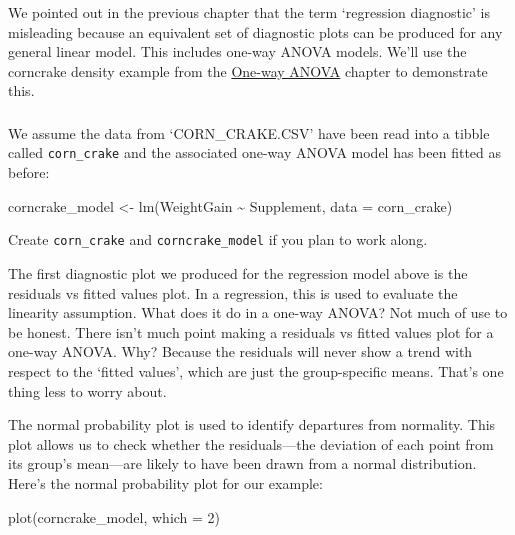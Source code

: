 \documentclass[
]{book}
\newenvironment{Shaded}{\begin{snugshade}}{\end{snugshade}}
\newcommand{\AttributeTok}[1]{\textcolor[rgb]{0.77,0.63,0.00}{#1}}
\newcommand{\DecValTok}[1]{\textcolor[rgb]{0.00,0.00,0.81}{#1}}
\newcommand{\FunctionTok}[1]{\textcolor[rgb]{0.00,0.00,0.00}{#1}}
\newcommand{\NormalTok}[1]{#1}
\newcommand{\OtherTok}[1]{\textcolor[rgb]{0.56,0.35,0.01}{#1}}
\newcommand{\SpecialCharTok}[1]{\textcolor[rgb]{0.00,0.00,0.00}{#1}}
\newenvironment{greybox}{
  \definecolor{shadecolor}{rgb}{0.95,0.95,0.95}  %
  \color{black}
  \begin{shaded}}
 {\end{shaded}}
\newenvironment{infobox}[1]
  {
  \begin{itemize}
  \renewcommand{\labelitemi}{
    \raisebox{-.7\height}[0pt][0pt]{
      {\setkeys{Gin}{width=3em,keepaspectratio}
        \texttt{[image: images/\#1]}}
    }
  }
  \setlength{\fboxsep}{1em}
  \begin{greybox}
  \item
  }
  {
  \end{greybox}
  \end{itemize}
  }
\begin{document}
We pointed out in the previous chapter that the term `regression diagnostic' is misleading because an equivalent set of diagnostic plots can be produced for any general linear model. This includes one-way ANOVA models. We'll use the corncrake density example from the \protect\hyperlink{one-way-anova-in-R}{One-way ANOVA} chapter to demonstrate this.

\begin{infobox}{action}

\hypertarget{section-14}{%
\subsubsection*{}\label{section-14}}

We assume the data from `CORN\_CRAKE.CSV' have been read into a tibble called \texttt{corn\_crake} and the associated one-way ANOVA model has been fitted as before:

\begin{Shaded}
\begin{Highlighting}[]
\NormalTok{corncrake\_model }\OtherTok{\textless{}{-}} \FunctionTok{lm}\NormalTok{(WeightGain }\SpecialCharTok{\textasciitilde{}}\NormalTok{ Supplement, }\AttributeTok{data =}\NormalTok{ corn\_crake)}
\end{Highlighting}
\end{Shaded}

Create \texttt{corn\_crake} and \texttt{corncrake\_model} if you plan to work along.

\end{infobox}

The first diagnostic plot we produced for the regression model above is the residuals vs fitted values plot. In a regression, this is used to evaluate the linearity assumption. What does it do in a one-way ANOVA? Not much of use to be honest. There isn't much point making a residuals vs fitted values plot for a one-way ANOVA. Why? Because the residuals will never show a trend with respect to the `fitted values', which are just the group-specific means. That's one thing less to worry about.

The normal probability plot is used to identify departures from normality. This plot allows us to check whether the residuals---the deviation of each point from its group's mean---are likely to have been drawn from a normal distribution. Here's the normal probability plot for our example:

\begin{Shaded}
\begin{Highlighting}[]
\FunctionTok{plot}\NormalTok{(corncrake\_model, }\AttributeTok{which =} \DecValTok{2}\NormalTok{)}
\end{Highlighting}
\end{Shaded}
\end{document}
